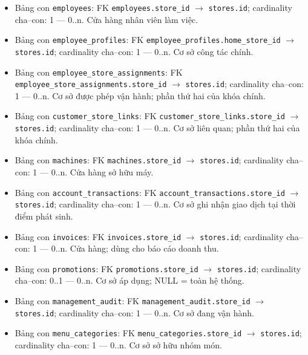 \begin{itemize}

\item Bảng con \texttt{employees}: FK \texttt{employees.store\_id} $\rightarrow$ \texttt{stores.id}; cardinality cha--con: 1 — 0..n. Cửa hàng nhân viên làm việc.

\item Bảng con \texttt{employee\_profiles}: FK \texttt{employee\_profiles.home\_store\_id} $\rightarrow$ \texttt{stores.id}; cardinality cha--con: 1 — 0..n. Cơ sở công tác chính.

\item Bảng con \texttt{employee\_store\_assignments}: FK \texttt{employee\_store\_assignments.store\_id} $\rightarrow$ \texttt{stores.id}; cardinality cha--con: 1 — 0..n. Cơ sở được phép vận hành; phần thứ hai của khóa chính.

\item Bảng con \texttt{customer\_store\_links}: FK \texttt{customer\_store\_links.store\_id} $\rightarrow$ \texttt{stores.id}; cardinality cha--con: 1 — 0..n. Cơ sở liên quan; phần thứ hai của khóa chính.

\item Bảng con \texttt{machines}: FK \texttt{machines.store\_id} $\rightarrow$ \texttt{stores.id}; cardinality cha--con: 1 — 0..n. Cửa hàng sở hữu máy.

\item Bảng con \texttt{account\_transactions}: FK \texttt{account\_transactions.store\_id} $\rightarrow$ \texttt{stores.id}; cardinality cha--con: 1 — 0..n. Cơ sở ghi nhận giao dịch tại thời điểm phát sinh.

\item Bảng con \texttt{invoices}: FK \texttt{invoices.store\_id} $\rightarrow$ \texttt{stores.id}; cardinality cha--con: 1 — 0..n. Cửa hàng; dùng cho báo cáo doanh thu.

\item Bảng con \texttt{promotions}: FK \texttt{promotions.store\_id} $\rightarrow$ \texttt{stores.id}; cardinality cha--con: 0..1 — 0..n. Cơ sở áp dụng; NULL = toàn hệ thống.

\item Bảng con \texttt{management\_audit}: FK \texttt{management\_audit.store\_id} $\rightarrow$ \texttt{stores.id}; cardinality cha--con: 1 — 0..n. Cơ sở đang vận hành.

\item Bảng con \texttt{menu\_categories}: FK \texttt{menu\_categories.store\_id} $\rightarrow$ \texttt{stores.id}; cardinality cha--con: 1 — 0..n. Cơ sở sở hữu nhóm món.


\end{itemize}
